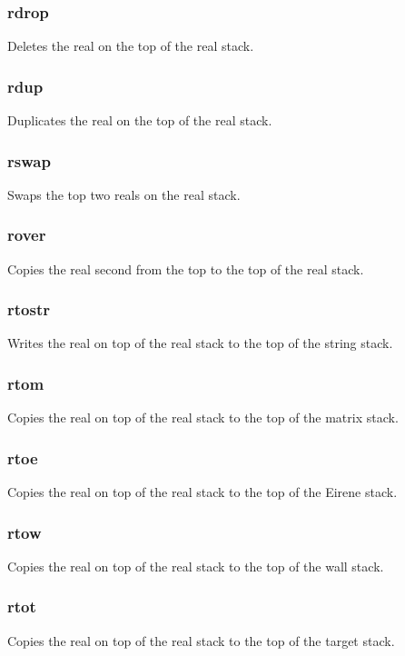 \documentclass[a4paper,10pt]{report}
\begin{document}
\subsubsection{rdrop}\label{sec:rdrop}
Deletes the real on the top of the real stack.

\subsubsection{rdup}\label{sec:rdup}
Duplicates the real on the top of the real stack.

\subsubsection{rswap}\label{sec:rswap}
Swaps the top two reals on the real stack.

\subsubsection{rover}\label{sec:rover}
Copies the real second from the top to the top of the real stack.

\subsubsection{rtostr}\label{sec:rtostr}
Writes the real on top of the real stack to the top of the string stack.

\subsubsection{rtom}\label{sec:rtom}
Copies the real on top of the real stack to the top of the matrix stack.

\subsubsection{rtoe}\label{sec:rtoe}
Copies the real on top of the real stack to the top of the Eirene stack.

\subsubsection{rtow}\label{sec:rtow}
Copies the real on top of the real stack to the top of the wall stack.

\subsubsection{rtot}\label{sec:rtot}
Copies the real on top of the real stack to the top of the target stack.
\end{document}
